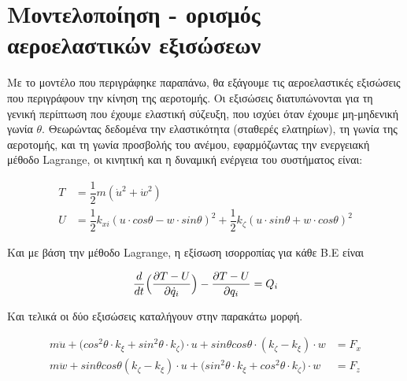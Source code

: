 \section{Μοντελοποίηση - ορισμός αεροελαστικών εξισώσεων}

Με το μοντέλο που περιγράφηκε παραπάνω, θα εξάγουμε τις αεροελαστικές εξισώσεις που περιγράφουν την κίνηση της αεροτομής. Οι εξισώσεις διατυπώνονται για τη γενική περίπτωση που έχουμε ελαστική σύζευξη, που ισχύει όταν έχουμε μη-μηδενική γωνία $\theta$. Θεωρώντας δεδομένα την ελαστικότητα (σταθερές ελατηρίων), τη γωνία της αεροτομής, και τη γωνία προσβολής του ανέμου, εφαρμόζωντας την ενεργειακή μέθοδο Lagrange, οι κινητική και η δυναμική ενέργεια του συστήματος είναι:

\begin{equation}
    \begin{aligned}
        T &= \dfrac{1}{2}m(\dot{u}^2+\dot{w}^2)\\
        U &= \dfrac{1}{2}k_{xi}(u\cdot cos\theta-w\cdot sin\theta)^2 + \dfrac{1}{2}k_{\zeta}(u \cdot sin\theta + w\cdot cos\theta)^2
    \end{aligned}
    \label{eq:lagrange}
\end{equation}

\vspace{0.5cm}

\noindent Και με βάση την μέθοδο Lagrange, η εξίσωση ισορροπίας για κάθε Β.Ε είναι

\vspace{0.3cm}

\begin{equation}
    \dfrac{d}{dt}\Big(\dfrac{\partial T-U}{\partial \dot{q}_i}\Big)-\dfrac{\partial T-U}{\partial q_i}=Q_i
    \label{eq:finlagrange}
\end{equation}

\vspace{0.5cm}

Και τελικά οι δύο εξισώσεις καταλήγουν στην παρακάτω μορφή.

\vspace{0.3cm}

\begin{equation}
   \begin{aligned} 
    m\ddot{u} + \big(cos^2\theta\cdot k_{\xi} + sin^2\theta \cdot k_{\zeta}\big)\cdot u + sin\theta cos\theta\cdot (k_{\zeta}-k_{\xi})\cdot w &= F_x\\
    m\ddot{w} + sin\theta cos\theta (k_{\zeta}-k_{\xi})\cdot u + \big(sin^2\theta\cdot k_{\xi} + cos^2\theta \cdot k_{\zeta}\big)\cdot w  &= F_z\\
   \end{aligned} 
    \label{eq:genElastic}
\end{equation}


